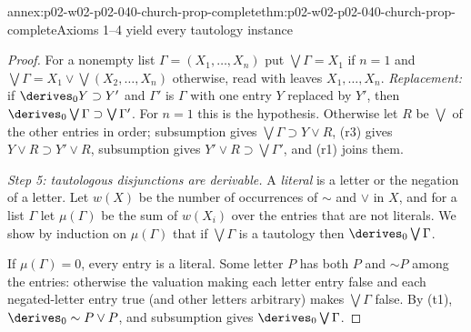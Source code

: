 \begin{annexitem}{annex:p02-w02-p02-040-church-prop-complete}{thm:p02-w02-p02-040-church-prop-complete}{Axioms 1--4 yield every tautology instance}
\begin{proof}
For a nonempty list \(\Gamma=(X_1,\ldots,X_n)\) put \(\bigvee\Gamma=X_1\) if
\(n=1\) and \(\bigvee\Gamma=X_1\vee\bigvee(X_2,\ldots,X_n)\) otherwise, read
with leaves \(X_1,\ldots,X_n\).  \emph{Replacement:} if \(\derives_0Y\supset Y'\)
and \(\Gamma'\) is \(\Gamma\) with one entry \(Y\) replaced by \(Y'\), then
\(\derives_0\bigvee\Gamma\supset\bigvee\Gamma'\).  For \(n=1\) this is the
hypothesis.  Otherwise let \(R\) be \(\bigvee\) of the other entries in order;
subsumption gives \(\bigvee\Gamma\supset Y\vee R\), (r3) gives
\(Y\vee R\supset Y'\vee R\), subsumption gives \(Y'\vee R\supset\bigvee\Gamma'\),
and (r1) joins them.

\emph{Step 5: tautologous disjunctions are derivable.}  A \emph{literal} is a
letter or the negation of a letter.  Let \(w(X)\) be the number of
occurrences of \(\sim\) and \(\vee\) in \(X\), and for a list \(\Gamma\) let
\(\mu(\Gamma)\) be the sum of \(w(X_i)\) over the entries that are not
literals.  We show by induction on \(\mu(\Gamma)\) that if \(\bigvee\Gamma\) is
a tautology then \(\derives_0\bigvee\Gamma\).

If \(\mu(\Gamma)=0\), every entry is a literal.  Some letter \(P\) has both
\(P\) and \(\sim P\) among the entries: otherwise the valuation making each
letter entry false and each negated-letter entry true (and other letters
arbitrary) makes \(\bigvee\Gamma\) false.  By (t1), \(\derives_0\sim P\vee P\),
and subsumption gives \(\derives_0\bigvee\Gamma\).


\end{proof}
\end{annexitem}
